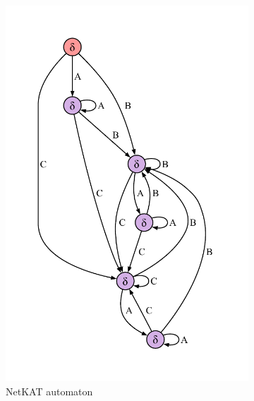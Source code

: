 \documentclass[acmsmall,dvipsnames,nonacm]{acmart}
\begin{document}
\begin{figure}
    \centering
    \begin{subfigure}[b]{0.4\textwidth}
        \includegraphics[scale=0.5]{deriv/deriv.pdf}
        \caption*{NetKAT automaton}
    \end{subfigure}
    \begin{subfigure}[b]{0.16\textwidth}

\end{subfigure}
\end{figure}
\end{document}
